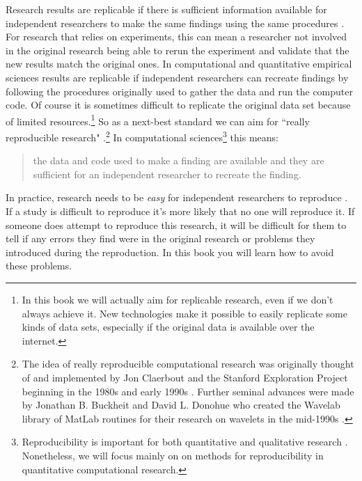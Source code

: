 \documentclass[krantz1]{krantz}
\begin{document}
Research results are replicable if there is sufficient information available for independent researchers to make the same findings using the same procedures \cite[444]{King1995}. For research that relies on experiments, this can mean a researcher not involved in the original research being able to rerun the experiment and validate that the new results match the original ones. In computational and quantitative empirical sciences results are replicable if independent researchers can recreate findings by following the procedures originally used to gather the data and run the computer code. Of course it is sometimes difficult to replicate the original data set because of limited resources.\footnote{In this book we will actually aim for replicable research, even if we don't always achieve it. New technologies make it possible to easily replicate some kinds of data sets, especially if the original data is available over the internet.} So as a next-best standard we can aim for ``really reproducible research" \cite[1226]{Peng2011}.\footnote{The idea of really reproducible computational research was originally thought of and implemented by Jon Claerbout and the Stanford Exploration Project beginning in the 1980s and early 1990s \cite[]{Fomel2009,Donohue2009}. Further seminal advances were made by Jonathan B. Buckheit and David L. Donohue who created the Wavelab library of MatLab routines for their research on wavelets in the mid-1990s \cite[]{Buckheit1995}.} In computational sciences\footnote{Reproducibility is important for both quantitative and qualitative research \cite[]{King1994}. Nonetheless, we will focus mainly on on methods for reproducibility in quantitative computational research.} this means:

\begin{quote}
    the data and code used to make a finding are available and they are sufficient for an independent researcher to recreate the finding.
\end{quote} 

In practice, research needs to be {\emph{easy}} for independent researchers to reproduce \cite[]{Ball2012}. If a study is difficult to reproduce it's more likely that no one will reproduce it. If someone does attempt to reproduce this research, it will be difficult for them to tell if any errors they find were in the original research or problems they introduced during the reproduction. In this book you will learn how to avoid these problems. 
\end{document}
